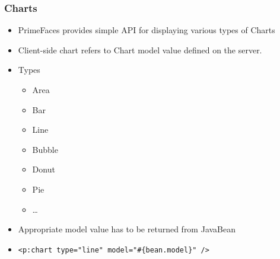 \documentclass[10pt,xcolor=pdflatex]{beamer}
\begin{document}
\begin{frame}[fragile]\frametitle{Charts}
  \begin{itemize}
    \item PrimeFaces provides simple API for displaying various types of Charts
	\item Client-side chart refers to Chart model value defined on the server.
	\item Types
      \begin{itemize}
    	\item Area
		\item Bar
		\item Line
		\item Bubble
		\item Donut
		\item Pie
		\item \ldots
      \end{itemize}
    \item Appropriate model value has to be returned from JavaBean
    \item[] \begin{footnotesize} \begin{verbatim}
<p:chart type="line" model="#{bean.model}" />
\end{verbatim} \end{footnotesize}
  \end{itemize}
\end{frame}
\end{document}

